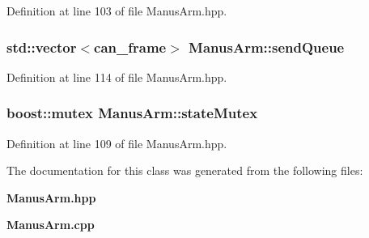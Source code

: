 \-Definition at line 103 of file \-Manus\-Arm.\-hpp.

\subsubsection[{send\-Queue}]{\setlength{\rightskip}{0pt plus 5cm}std\-::vector$<$can\-\_\-frame$>$ {\bf \-Manus\-Arm\-::send\-Queue}\hspace{0.3cm}{\ttfamily  [private]}}\label{classManusArm_ae2c56bb1f4f070175e891f53e89b5db2}


\-Definition at line 114 of file \-Manus\-Arm.\-hpp.

\subsubsection[{state\-Mutex}]{\setlength{\rightskip}{0pt plus 5cm}boost\-::mutex {\bf \-Manus\-Arm\-::state\-Mutex}\hspace{0.3cm}{\ttfamily  [private]}}\label{classManusArm_a5391659e5a713fc592825b8758a27edf}


\-Definition at line 109 of file \-Manus\-Arm.\-hpp.



\-The documentation for this class was generated from the following files\-:\begin{DoxyCompactItemize}
\item 
{\bf \-Manus\-Arm.\-hpp}\item 
{\bf \-Manus\-Arm.\-cpp}\end{DoxyCompactItemize}
